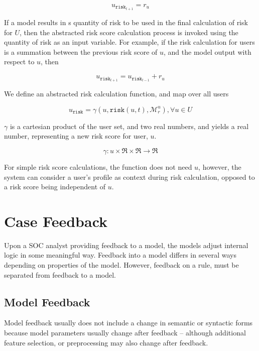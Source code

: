 \documentclass[10pt, titlepage, twocolumn]{report}
\begin{document}
\begin{equation}
u_{\texttt{risk}_{t+1}} = r_u
\end{equation}

If a model results in s quantity of risk to be used in the final calculation of risk for \(U\), then the abstracted risk score calculation process is invoked using the quantity of risk as an input variable. For example, if the risk calculation for users is a summation between the previous risk score of \(u\), and the model output with respect to \(u\), then

\begin{equation}
u_{\texttt{risk}_{t+1}} = u_{\texttt{risk}_{t-1}}+ r_u
\end{equation}

We define an abstracted risk calculation function, and map over all users

\begin{equation}
u_{\texttt{risk}} = \gamma(u, \texttt{risk}(u, t), \boldsymbol {\mathcal{M}}_{ r }^u), \forall u \in U
\end{equation}

\(\gamma\) is a cartesian product of the user set, and two real numbers, and yields a real number, representing a new risk score for user, \(u\). 

\begin{equation}
\gamma : u \times \Re \times \Re \rightarrow \Re
\end{equation}

For simple risk score calculations, the function does not need \(u\), however, the system can consider a user's profile as context during risk calculation, opposed to a risk score being independent of \(u\).





\section{Case Feedback}

Upon a SOC analyst providing feedback to a model, the models adjust internal logic in some meaningful way. Feedback into a model differs in several ways depending on properties of the model. However, feedback on a rule, must be separated from feedback to a model.

\subsection{Model Feedback}
Model feedback usually does not include a change in semantic or syntactic forms because model parameters usually change after feedback -- although additional feature selection, or preprocessing may also change after feedback.
\end{document}
